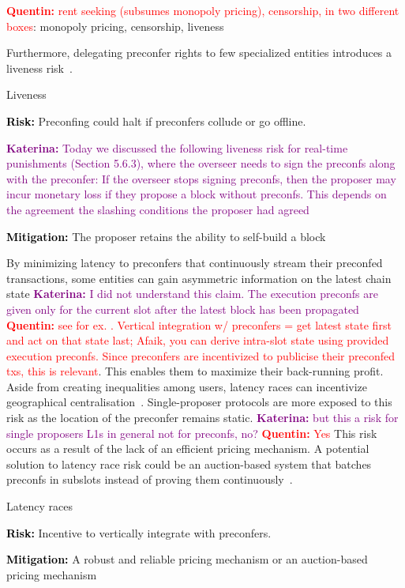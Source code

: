 \documentclass[a4paper]{article}
\theoremstyle{boldstyle}
\newlength{\entrysep}
\newcommand{\risk}[1]{\par\noindent\textbf{\textcolor{black}{Risk:}} #1\par\vspace{\entrysep}}
\newcommand{\mitigation}[1]{\par\noindent\textbf{\textcolor{black}{Mitigation:}} #1}
\newcommand{\qb}[1]{\textcolor{red}{\textbf{Quentin:} #1}}
\newcommand{\ks}[1]{\textcolor{purple}{\textbf{Katerina:} #1}}
\begin{document}
        \qb{rent seeking (subsumes monopoly pricing), censorship, in two different boxes}: monopoly pricing, censorship, liveness

        
        Furthermore, delegating preconfer rights to few specialized entities introduces a liveness risk~\cite{W:StrawmanningBasedPreconfirmations,W:BasedPreconfirmationswithMulti-roundMEV-Boost}. 
        \begin{riskbox}{Liveness}
            \risk{Preconfing could halt if preconfers collude or go offline.} \ks{Today we discussed the following liveness risk for real-time punishments (Section 5.6.3), where the overseer needs to sign the preconfs along with the preconfer: If the overseer stops signing preconfs, then the proposer may incur monetary loss if they propose a block without preconfs. This depends on the agreement the slashing conditions the proposer had agreed}
            \mitigation{The proposer retains the ability to self-build a block}
        \end{riskbox}
        By minimizing latency to preconfers that continuously stream their preconfed transactions, some entities can gain asymmetric information on the latest chain state \ks{ I did not understand this claim. The execution preconfs are given only for the current slot after the latest block has been propagated} \qb{see for ex. \cite{W:StrawmanningBasedPreconfirmations}. Vertical integration w/ preconfers = get latest state first and act on that state last; Afaik, you can derive intra-slot state using provided execution preconfs. Since preconfers are incentivized to publicise their preconfed txs, this is relevant}. This enables them to maximize their back-running profit. Aside from creating inequalities among users, latency races can incentivize geographical centralisation~\cite{W:StrawmanningBasedPreconfirmations}. 
        Single-proposer protocols are more exposed to this risk as the location of the preconfer remains static. \ks{but this a risk for single proposers L1s in general not for preconfs, no?} \qb{Yes }
        This risk occurs as a result of the lack of an efficient pricing mechanism. A potential solution to latency race risk could be an auction-based system that batches preconfs in subslots instead of proving them continuously~\cite{W:BasedPreconfirmationswithMulti-roundMEV-Boost}.
        \begin{riskbox}{Latency races}
            \risk{Incentive to vertically integrate with preconfers.}
            \mitigation{A robust and reliable pricing mechanism or an auction-based pricing mechanism}
        \end{riskbox}
        
\end{document}
